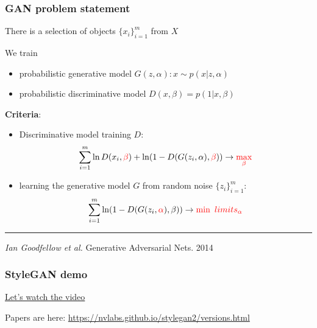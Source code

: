 \documentclass[fullscreen=true, bookmarks=true, hyperref={pdfencoding=unicode}]{beamer}
\begin{document}
\begin{frame}
  \frametitle{GAN problem statement}

  There is a selection of objects $\{x_i\}_{i=1}^m$ from $X$

  We train

  \begin{itemize}
    \item probabilistic generative model $G(z, \alpha): x \sim p(x|z,\alpha)$
    \item probabilistic discriminative model $D(x, \beta) = p(1| x, \beta)$
  \end{itemize}

  \pause
   {\bf Criteria}:
   \begin{itemize}
     \item Discriminative model training $D$:
     $$ \sum\limits_{i=1}^m \ln D(x_i, {\color{red}\beta}) + \ln(1 - D(G(z_i, \alpha), {\color{red}\beta})) \to {\color{red}\max\limits_{\beta}}$$
     \item learning the generative model $G$ from random noise $\{z_i\}_{i=1}^m$:
     $$ \sum\limits_{i=1}^m \ln(1 - D(G(z_i, {\color{red}\alpha}), \beta)) \to {\color{red}\min\ limits_{\alpha}}$$
   \end{itemize}

  \noindent\rule{8cm}{0.4pt}

  {\footnotesize
  {\it Ian Goodfellow et al.} Generative Adversarial Nets. 2014}
\end{frame}


\begin{frame}
  \frametitle{StyleGAN demo}

  \href{https://www.youtube.com/watch?v=kSLJriaOumA}{Let's watch the video}

  \vspace{2cm}
  Papers are here: \href{https://nvlabs.github.io/stylegan2/versions.html}{https://nvlabs.github.io/stylegan2/versions.html}

\end{frame}
\end{document}
